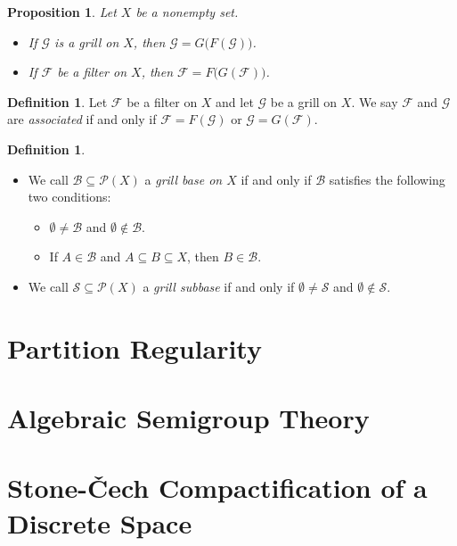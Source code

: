 \documentclass[12pt]{article}
\theoremstyle{plain}
\newtheorem{prop}[thm]{Proposition}
\theoremstyle{definition}
\newtheorem{defn}[thm]{Definition}
\newcommand{\calB}{\mathcal{B}}
\newcommand{\calF}{\mathcal{F}}
\newcommand{\calG}{\mathcal{G}}
\newcommand{\calP}{\mathcal{P}}
\newcommand{\calS}{\mathcal{S}}
\begin{document}
\begin{prop}
  Let $X$ be a nonempty set.
  \begin{itemize}
    \item[(a)] If $\calG$ is a grill on $X$, then $\calG = G\bigl(F(\calG)\bigr)$.
    
    \item[(b)] If $\calF$ be a filter on $X$, then $\calF = F\bigl(G(\calF)\bigr)$.
  \end{itemize}
\end{prop}

\begin{defn}
  Let $\calF$ be a filter on $X$ and let $\calG$ be a grill on $X$.
  We say $\calF$ and $\calG$ are \textsl{associated} if and only if $\calF = F(\calG)$ or $\calG = G(\calF)$. 
\end{defn}



\begin{defn}
  \begin{itemize}
    \item[(b)] We call $\calB \subseteq \calP(X)$ a \textsl{grill base on $X$} if and only if $\calB$     satisfies the following two conditions:
      \begin{itemize}
        \item[(1)] $\emptyset \ne \calB$ and $\emptyset \not\in \calB$.

        \item[(2)] If $A \in \calB$ and $A \subseteq B \subseteq X$, then $B \in \calB$.
      \end{itemize}

    \item[(c)] We call $\calS \subseteq \calP(X)$ a \textsl{grill subbase} if and only if $\emptyset \ne \calS$ and $\emptyset \not\in \calS$. 
  \end{itemize}
\end{defn}




\section{Partition Regularity}
\section{Algebraic Semigroup Theory}
\section{Stone-\v{C}ech Compactification of a Discrete Space}
\end{document}
